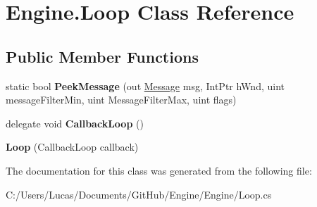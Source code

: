 \hypertarget{class_engine_1_1_loop}{\section{Engine.\-Loop Class Reference}
\label{class_engine_1_1_loop}
}
\subsection*{Public Member Functions}
\begin{DoxyCompactItemize}
\item 
\hypertarget{class_engine_1_1_loop_ae831edaea664fe90ce2c1fcccaed97b9}{static bool {\bfseries Peek\-Message} (out \hyperlink{struct_engine_1_1_message}{Message} msg, Int\-Ptr h\-Wnd, uint message\-Filter\-Min, uint Message\-Filter\-Max, uint flags)}\label{class_engine_1_1_loop_ae831edaea664fe90ce2c1fcccaed97b9}

\item 
\hypertarget{class_engine_1_1_loop_a0b2ba479d4339015f83618e651f25ef1}{delegate void {\bfseries Callback\-Loop} ()}\label{class_engine_1_1_loop_a0b2ba479d4339015f83618e651f25ef1}

\item 
\hypertarget{class_engine_1_1_loop_afcce921e17b0d6053f6abcf3423871dd}{{\bfseries Loop} (Callback\-Loop callback)}\label{class_engine_1_1_loop_afcce921e17b0d6053f6abcf3423871dd}

\end{DoxyCompactItemize}


The documentation for this class was generated from the following file\-:\begin{DoxyCompactItemize}
\item 
C\-:/\-Users/\-Lucas/\-Documents/\-Git\-Hub/\-Engine/\-Engine/Loop.\-cs\end{DoxyCompactItemize}
